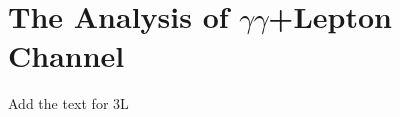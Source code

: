 \section{The Analysis of $\gamma\gamma$+Lepton Channel }
\label{sec:AnaYYL}
Add the text for 3L




